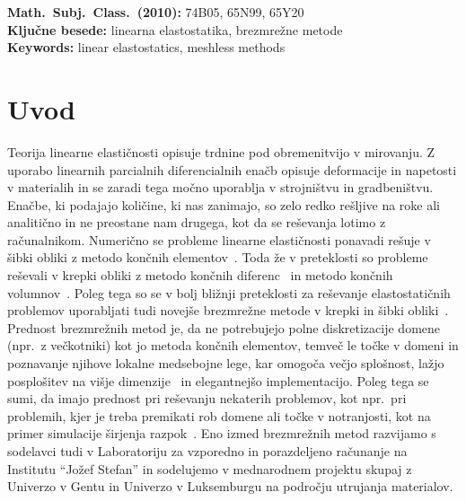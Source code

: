 \documentclass[12pt,a4paper,twoside]{article}
\theoremstyle{definition} %
\theoremstyle{plain} %
\numberwithin{equation}{section}
\let\oldsection\section
\def\section{\cleardoublepage\oldsection}
\begin{document}
\vfill\noindent
\textbf{Math.~Subj.~Class.~(2010):} 74B05, 65N99, 65Y20 \\[1mm]
\textbf{Ključne besede:} linearna elastostatika, brezmrežne metode \\[1mm]
\textbf{Keywords:} linear elastostatics, meshless methods


\cleardoublepage

\setcounter{page}{1}

\section{Uvod}

Teorija linearne elastičnosti opisuje trdnine pod obremenitvijo v mirovanju. Z uporabo linearnih
parcialnih diferencialnih enačb opisuje deformacije in napetosti v materialih in se zaradi tega
močno uporablja v strojništvu in gradbeništvu. Enačbe, ki podajajo količine, ki nas zanimajo,
so zelo redko rešljive na roke ali analitično in ne preostane nam drugega, kot da se reševanja
lotimo z računalnikom. Numerično se probleme linearne elastičnosti ponavadi rešuje v šibki obliki z
metodo končnih elementov~\cite{uienkiewicz2000finite}. Toda že v preteklosti so probleme reševali v
krepki obliki z metodo končnih diferenc~\cite{hattel1995control} in metodo končnih
volumnov~\cite{stone2003dynamic}. Poleg tega so se v bolj bližnji preteklosti za reševanje
elastostatičnih problemov uporabljati tudi novejše brezmrežne metode v krepki in šibki
obliki~\cite{chen2006meshless,mavric2015local}. Prednost brezmrežnih metod je, da ne potrebujejo
polne diskretizacije domene (npr.~z večkotniki) kot jo metoda končnih elementov, temveč le točke v
domeni in poznavanje njihove lokalne medsebojne lege, kar omogoča večjo splošnost, lažjo posplošitev
na višje dimenzije~\cite{dehghan2014numerical,li2013localized} in elegantnejšo implementacijo. Poleg
tega se sumi, da imajo prednost pri reševanju nekaterih problemov, kot npr.~pri problemih, kjer je
treba premikati rob domene ali točke v notranjosti, kot na primer simulacije širjenja
razpok~\cite{rao2000efficient}. Eno izmed brezmrežnih metod razvijamo s sodelavci  tudi v
Laboratoriju za vzporedno in porazdeljeno računanje na Institutu ``Jožef Stefan'' in sodelujemo v
mednarodnem projektu skupaj z Univerzo v Gentu in Univerzo v Luksemburgu na področju utrujanja
materialov.
\end{document}
